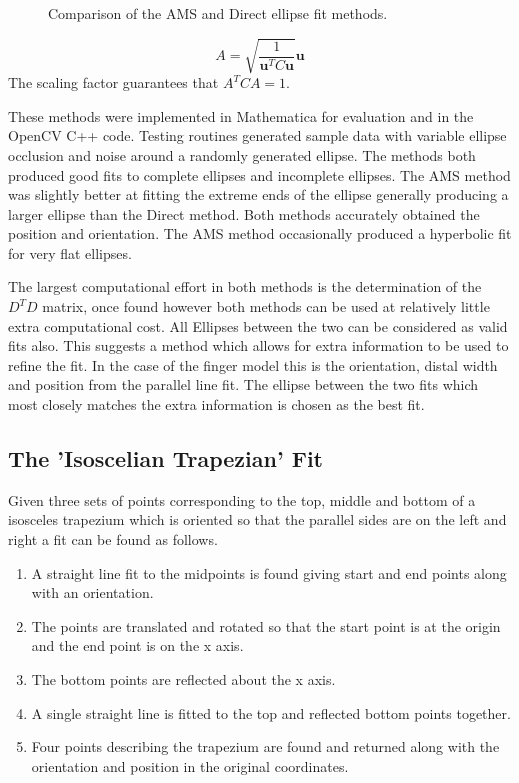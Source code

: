 \begin{figure}[p]
{\label{fig:EllipseFitTestHalf}}
\caption{Comparison of the AMS and Direct ellipse fit methods.}
\label{fig:EllipseFitTest}
\end{figure}

\begin{equation*}
 A = \sqrt{\frac{1}{\mathbf{u}^T C \mathbf{u}}}  \mathbf{u}
\end{equation*}
The scaling factor guarantees that  $A^T C A =1$.

These methods were implemented in Mathematica for evaluation and in the OpenCV C++ code. Testing routines generated sample data with variable ellipse occlusion and noise around a randomly generated ellipse. The methods both produced good fits to complete ellipses and incomplete ellipses. The AMS method was slightly better at fitting the extreme ends of the ellipse generally producing a larger ellipse than the Direct method. Both methods accurately obtained the position and orientation. The AMS method occasionally produced a hyperbolic fit for very flat ellipses.


The largest computational effort in both methods is the determination of the $D^T D$ matrix, once found however both methods can be used at relatively little extra computational cost. All Ellipses between the two can be considered as valid fits also. This suggests a method which allows for extra information to be used to refine the fit. In the case of the finger model this is the orientation, distal width and position from the parallel line fit. The ellipse between the two fits which most closely matches the extra information is chosen as the best fit.

\subsection{The 'Isoscelian Trapezian' Fit}\label{sec:TrapezianFit}

Given three sets of points corresponding to the top, middle and bottom of a isosceles trapezium which is oriented so that the parallel sides are on the left and right a fit can be found as follows.

\begin{enumerate}
\item A straight line fit to the midpoints is found giving start and end points along with an orientation.
\item The points are translated and rotated so that the start point is at the origin and the end point is on the x axis.
\item The bottom points are reflected about the x axis.
\item A single straight line is fitted to the top and reflected bottom points together.
\item Four points describing the trapezium are found and returned along with the orientation and position in the original coordinates.
\end{enumerate}

